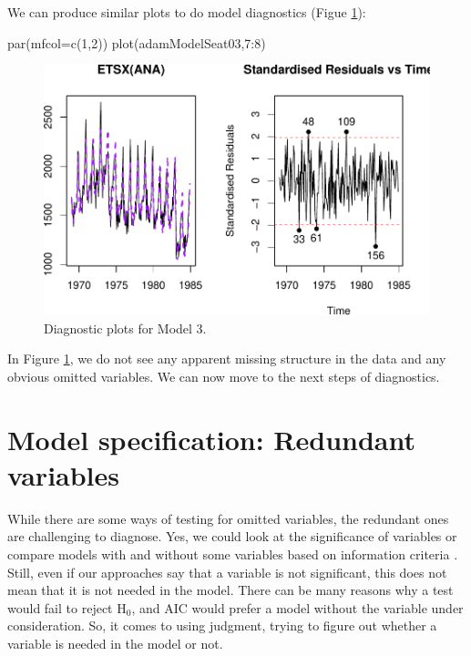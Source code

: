 \documentclass[
]{book}
\newenvironment{Shaded}{\begin{snugshade}}{\end{snugshade}}
\newcommand{\AttributeTok}[1]{\textcolor[rgb]{0.77,0.63,0.00}{#1}}
\newcommand{\DecValTok}[1]{\textcolor[rgb]{0.00,0.00,0.81}{#1}}
\newcommand{\FunctionTok}[1]{\textcolor[rgb]{0.00,0.00,0.00}{#1}}
\newcommand{\NormalTok}[1]{#1}
\newcommand{\SpecialCharTok}[1]{\textcolor[rgb]{0.00,0.00,0.00}{#1}}
\theoremstyle{definition}
\theoremstyle{definition}
\theoremstyle{definition}
\theoremstyle{definition}
\theoremstyle{remark}
\begin{document}
We can produce similar plots to do model diagnostics (Figue \ref{fig:adamModelSeat03}):

\begin{Shaded}
\begin{Highlighting}[]
\FunctionTok{par}\NormalTok{(}\AttributeTok{mfcol=}\FunctionTok{c}\NormalTok{(}\DecValTok{1}\NormalTok{,}\DecValTok{2}\NormalTok{))}
\FunctionTok{plot}\NormalTok{(adamModelSeat03,}\DecValTok{7}\SpecialCharTok{:}\DecValTok{8}\NormalTok{)}
\end{Highlighting}
\end{Shaded}

\begin{figure}
\centering
\includegraphics{Svetunkov--2022----ADAM_files/figure-latex/adamModelSeat03-1.pdf}
\caption{\label{fig:adamModelSeat03}Diagnostic plots for Model 3.}
\end{figure}

In Figure \ref{fig:adamModelSeat03}, we do not see any apparent missing structure in the data and any obvious omitted variables. We can now move to the next steps of diagnostics.

\hypertarget{diagnosticsRedundant}{%
\section{Model specification: Redundant variables}\label{diagnosticsRedundant}}

While there are some ways of testing for omitted variables, the redundant ones are challenging to diagnose. Yes, we could look at the significance of variables \citep[Section 5.3 of][]{SvetunkovSBA} or compare models with and without some variables based on information criteria \citep[Section 13.4 of][]{SvetunkovSBA}. Still, even if our approaches say that a variable is not significant, this does not mean that it is not needed in the model. There can be many reasons why a test would fail to reject H\(_0\), and AIC would prefer a model without the variable under consideration. So, it comes to using judgment, trying to figure out whether a variable is needed in the model or not.
\end{document}
